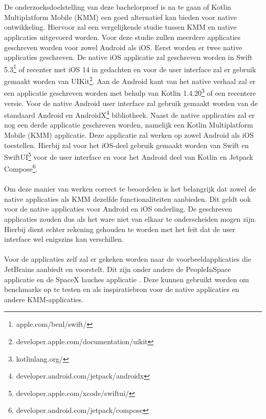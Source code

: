 \section{}
\label{sec:onderzoeksdoelstelling}

De onderzoeksdoelstelling van deze bachelorproef is na te gaan of Kotlin Multiplatform Mobile (KMM) een goed alternatief kan bieden voor native ontwikkeling. Hiervoor zal een vergelijkende studie tussen KMM en native applicaties uitgevoerd worden. Voor deze studie zullen meerdere applicaties geschreven worden voor zowel Android als iOS. Eerst worden er twee native applicaties geschreven. De native iOS applicatie zal geschreven worden in Swift 5.3\footnote{apple.com/benl/swift/} of recenter met iOS 14 in gedachten en voor de user interface zal er gebruik gemaakt worden van UIKit\footnote{developer.apple.com/documentation/uikit}. Aan de Android kant van het native verhaal zal er een applicatie geschreven worden met behulp van Kotlin 1.4.20\footnote{kotlinlang.org/} of een recentere versie. Voor de native Android user interface zal gebruik gemaakt worden van de standaard Android en AndroidX\footnote{developer.android.com/jetpack/androidx} bibliotheek. Naast de native applicaties zal er nog een derde applicatie geschreven worden, namelijk een Kotlin Multiplatform Mobile (KMM) applicatie. Deze applicatie zal werken op zowel Android als iOS toestellen. Hierbij zal voor het iOS-deel gebruik gemaakt worden van Swift en SwiftUI\footnote{developer.apple.com/xcode/swiftui/} voor de user interface en voor het Android deel van Kotlin en Jetpack Compose\footnote{developer.android.com/jetpack/compose}.
\\ \\
Om deze manier van werken correct te beoordelen is het belangrijk dat zowel de native applicaties als KMM dezelfde functionaliteiten aanbieden. Dit geldt ook voor de native applicaties voor Android en iOS onderling. De geschreven applicaties zouden dus als het ware niet van elkaar te onderscheiden mogen zijn. Hierbij dient echter rekening gehouden te worden met het feit dat de user interface wel enigszins kan verschillen.
\\ \\
Voor de applicaties zelf zal er gekeken worden naar de voorbeeldapplicaties die JetBrains aanbiedt en voorstelt. Dit zijn onder andere de PeopleInSpace applicatie \autocite{OReilly2021} en de SpaceX lauches applicatie \autocite{Kotlin2020HandsOn}. Deze kunnen gebruikt worden om benchmarks op te testen en als inspiratiebron voor de native applicaties en andere KMM-applicaties.
